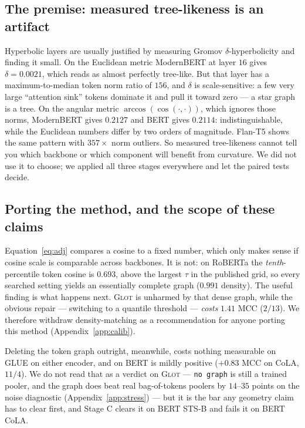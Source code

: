 \documentclass{article}
\begin{document}
\subsection{The premise: measured tree-likeness is an artifact}
\label{sec:premise}

Hyperbolic layers are usually justified by measuring Gromov
$\delta$-hyperbolicity and finding it small. On the Euclidean metric ModernBERT
at layer $16$ gives $\delta = 0.0021$, which reads as almost perfectly
tree-like. But that layer has a maximum-to-median token norm ratio of $156$, and
$\delta$ is scale-sensitive: a few very large ``attention sink'' tokens dominate
it and pull it toward zero --- a star graph is a tree. On the angular metric
$\arccos(\cos(\cdot,\cdot))$, which ignores those norms, ModernBERT gives
$0.2127$ and BERT gives $0.2114$: indistinguishable, while the Euclidean numbers
differ by two orders of magnitude. Flan-T5 shows the same pattern with
$357\times$ norm outliers. So measured tree-likeness cannot tell you which
backbone or which component will benefit from curvature. We did not use it to
choose; we applied all three stages everywhere and let the paired tests decide.

\subsection{Porting the method, and the scope of these claims}
\label{sec:porting}

Equation~\ref{eq:adj} compares a cosine to a fixed number, which only makes
sense if cosine scale is comparable across backbones. It is not: on RoBERTa the
\emph{tenth}-percentile token cosine is $0.693$, above the largest $\tau$ in the
published grid, so every searched setting yields an essentially complete graph
($0.991$ density). The useful finding is what happens next. \textsc{Glot} is
unharmed by that dense graph, while the obvious repair --- switching to a
quantile threshold --- \emph{costs} $1.41$ MCC ($2/13$). We therefore withdraw
density-matching as a recommendation for anyone porting this method
(Appendix~\ref{app:calib}).

Deleting the token graph outright, meanwhile, costs nothing measurable on GLUE
on either encoder, and on BERT is mildly positive ($+0.83$ MCC on CoLA, $11/4$).
We do not read that as a verdict on \textsc{Glot} --- \texttt{no graph} is still
a trained pooler, and the graph does beat real bag-of-tokens poolers by
$14$--$35$ points on the noise diagnostic (Appendix~\ref{app:stress}) --- but it
is the bar any geometry claim has to clear first, and Stage C clears it on BERT
STS-B and fails it on BERT CoLA.
\end{document}
